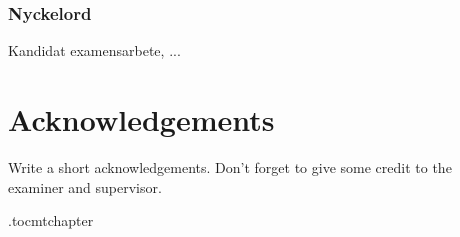 \subsection*{Nyckelord}
Kandidat examensarbete, ...


\newpage
\thispagestyle{plain}
\chapter*{Acknowledgements}
Write a short acknowledgements. Don't forget to give some credit to the examiner and supervisor.

\newpage



\newpage

\etocdepthtag.toc{mtchapter}
\thispagestyle{plain}
\tableofcontents

\newpage


